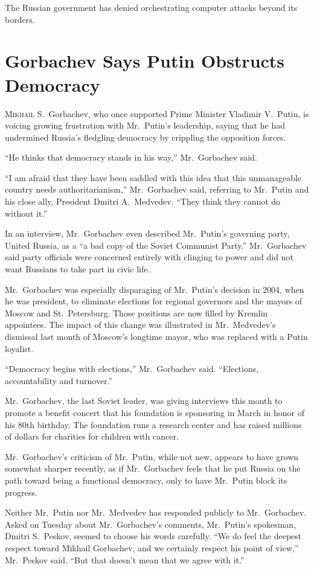 ﻿\documentclass[12pt]{article}
\begin{document}
The Russian government has denied orchestrating computer attacks beyond its borders.

\section{Gorbachev Says Putin Obstructs Democracy}

\lettrine{M}{ikhail} S.~Gorbachev, who once supported Prime Minister
Vladimir V.~Putin, is voicing growing frustration with Mr.~Putin's leadership, saying that he had
undermined Russia's fledgling democracy by crippling the opposition forces.

``He thinks that democracy stands in his way,'' Mr.~Gorbachev said.

``I am afraid that they have been saddled with this idea that this unmanageable country needs
authoritarianism,'' Mr.~Gorbachev said, referring to Mr.~Putin and his close ally, President Dmitri
A.~Medvedev. ``They think they cannot do without it.''

In an interview, Mr.~Gorbachev even described Mr.~Putin's governing party, United Russia, as a ``a
bad copy of the Soviet Communist Party.'' Mr.~Gorbachev said party officials were concerned entirely
with clinging to power and did not want Russians to take part in civic life.

Mr.~Gorbachev was especially disparaging of Mr.~Putin's decision in 2004, when he was president, to
eliminate elections for regional governors and the mayors of Moscow and St.~Petersburg. Those
positions are now filled by Kremlin appointees. The impact of this change was illustrated in
Mr.~Medvedev's dismissal last month of Moscow's longtime mayor, who was replaced with a Putin
loyalist.

``Democracy begins with elections,'' Mr.~Gorbachev said. ``Elections, accountability and turnover.''

Mr.~Gorbachev, the last Soviet leader, was giving interviews this month to promote a benefit concert
that his foundation is sponsoring in March in honor of his 80th birthday. The foundation runs a
research center and has raised millions of dollars for charities for children with cancer.

Mr.~Gorbachev's criticism of Mr.~Putin, while not new, appears to have grown somewhat sharper
recently, as if Mr.~Gorbachev feels that he put Russia on the path toward being a functional
democracy, only to have Mr.~Putin block its progress.

Neither Mr.~Putin nor Mr.~Medvedev has responded publicly to Mr.~Gorbachev. Asked on Tuesday about
Mr.~Gorbachev's comments, Mr.~Putin's spokesman, Dmitri S.~Peskov, seemed to choose his words
carefully. ``We do feel the deepest respect toward Mikhail Gorbachev, and we certainly respect his
point of view,'' Mr.~Peskov said. ``But that doesn't mean that we agree with it.''
\end{document}
